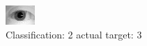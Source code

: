 \begin{figure}[h!]
\begin{center}
\includegraphics[width=0.60\columnwidth]{figures/ID1041_class_2_target_3.png}
\end{center}
\caption{ Classification: 2 actual target: 3}
\label{fig:ID1041_class_2_target_3}
\end{figure}
